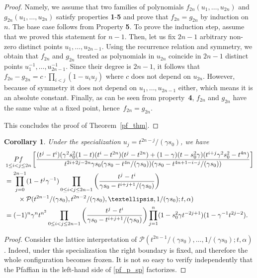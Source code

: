 \documentclass[11pt]{article}
\newtheorem{coro}[theo]{Corollary}
\theoremstyle{definition}
\newcommand{\pf}{\mathop{\rm Pf}}
\begin{document}
\begin{proof}
	Namely, we assume that two families of polynomials $f_{2n}(u_1, \dots, u_{2n})$ and $g_{2n}(u_1, \dots, u_{2n})$ satisfy properties \textbf{1}-\textbf{5} and prove that $f_{2n} = g_{2n}$ by induction on $n$. The base case  follows from Property \textbf{5}. To prove the induction step, assume that we proved this statement for $n-1$. Then, let us fix $2n-1$ arbitrary non-zero distinct points $u_1, \dots, u_{2n-1}$. Using the recurrence relation and symmetry, we obtain that $f_{2n}$ and $g_{2n}$ treated as polynomials in $u_{2n}$ coincide in $2n-1$  distinct points $u_{1}^{-1}, \dots, u_{2n-1}^{-1}$. Since their degree is $2n-1$, it follows that $f_{2n} - g_{2n} = c \cdot \prod_{i<j}(1 - u_i u_j)$ where $c$ does not depend on $u_{2n}$. However, because of symmetry it does not depend on $u_1, \dots, u_{2n-1}$ either, which means it is an absolute constant. Finally, as can be seen from property~\textbf{4}, $f_{2n}$ and $g_{2n}$ have the same value at a fixed point, hence~$f_{2n} = g_{2n}$.
	
	This concludes the proof of Theorem~\ref{pf_thm}.
\end{proof}

\begin{coro}
	Under the specialization $u_j = t^{2n - j} / (\gamma s_{0})$, we have 
	\begin{equation} \label{pf_p_sp}
	\begin{split}
	&\pf_{1\leq i < j \leq 2n}
	\left[
	\frac{ (t^{j} - t^{i})(\gamma^2 s_0^2(1 - t)(t^{i} - t^{2n})(t^{j}- t^{2n}) + (1 - \gamma)(t-s_{0}^{2}\gamma)(t^{i+j}\gamma^2 s_0^2-t^{4n})}
	{t^{2i+2j-2n}\gamma s_0(\gamma s_0-t^{4n}/(\gamma s_0)) (\gamma s_0 -t^{4n+1-i-j}/(\gamma s_0))}
	\right]
	\\
	&=\prod_{j = 0}^{2n-1} (1 - t^j\gamma^{-1}) \prod_{0 \leq i<j \leq 2n-1}
	\left(
	\frac{t^j - t^i}{\gamma s_0 -t^{i+j+1} / (\gamma s_0)}
	\right)\\
	&\qquad\times
	\mathcal{P}(t^{2n - 1} / (\gamma s_{0}), t^{2n - 2} / (\gamma s_{0}), \dots, 1 / (\gamma s_{0}); t, \alpha)  \\
	&=(-1)^{n} \gamma^{n} t^{n^{2}} \prod_{0 \leq i<j \leq 2n-1}
	\left(
	\frac{t^j - t^i}{\gamma s_0 -t^{i+j+1} / (\gamma s_0)}
	\right)
	\prod_{j=1}^{n}(1 - s_{0}^{2}\gamma t^{-2j+1})(1 - \gamma^{-1} t^{2j-2})
	.
	\end{split}
	\end{equation}
\end{coro}
\begin{proof}
	Consider the lattice interpretation of $\mathcal{P}(t^{2n - 1} / (\gamma s_{0}), \dots, 1 / (\gamma s_{0}); t, \alpha)$. Indeed, under this specialization the right boundary is fixed, and therefore the whole configuration becomes frozen.
	It is not so easy to verify independently that the Pfaffian in the left-hand side of \eqref{pf_p_sp} factorizes.
\end{proof}
\end{document}
